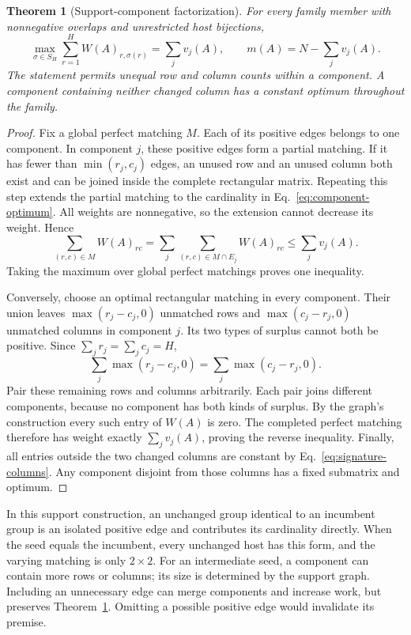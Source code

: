 \documentclass[11pt]{article}
\newtheorem{theorem}{Theorem}
\begin{document}
\begin{theorem}[Support-component factorization]\label{thm:component}
For every family member with nonnegative overlaps and unrestricted host bijections,
\begin{equation}
\max_{\sigma\in S_H}\sum_{r=1}^H W(A)_{r,\sigma(r)}=\sum_jv_j(A),\qquad
m(A)=N-\sum_jv_j(A).
\label{eq:component-factorization}
\end{equation}
The statement permits unequal row and column counts within a component. A component containing neither changed column has a constant optimum throughout the family.
\end{theorem}
\begin{proof}
Fix a global perfect matching $M$. Each of its positive edges belongs to one component. In component $j$, these positive edges form a partial matching. If it has fewer than $\min(r_j,c_j)$ edges, an unused row and an unused column both exist and can be joined inside the complete rectangular matrix. Repeating this step extends the partial matching to the cardinality in Eq.~\eqref{eq:component-optimum}. All weights are nonnegative, so the extension cannot decrease its weight. Hence
\begin{equation}
\sum_{(r,c)\in M}W(A)_{rc}
=\sum_j\sum_{(r,c)\in M\cap E_j}W(A)_{rc}
\le\sum_jv_j(A).
\end{equation}
Taking the maximum over global perfect matchings proves one inequality.

Conversely, choose an optimal rectangular matching in every component. Their union leaves $\max(r_j-c_j,0)$ unmatched rows and $\max(c_j-r_j,0)$ unmatched columns in component $j$. Its two types of surplus cannot both be positive. Since $\sum_jr_j=\sum_jc_j=H$,
\begin{equation}
\sum_j\max(r_j-c_j,0)=\sum_j\max(c_j-r_j,0).
\end{equation}
Pair these remaining rows and columns arbitrarily. Each pair joins different components, because no component has both kinds of surplus. By the graph's construction every such entry of $W(A)$ is zero. The completed perfect matching therefore has weight exactly $\sum_jv_j(A)$, proving the reverse inequality. Finally, all entries outside the two changed columns are constant by Eq.~\eqref{eq:signature-columns}. Any component disjoint from those columns has a fixed submatrix and optimum.
\end{proof}

In this support construction, an unchanged group identical to an incumbent group is an isolated positive edge and contributes its cardinality directly. When the seed equals the incumbent, every unchanged host has this form, and the varying matching is only $2\times2$. For an intermediate seed, a component can contain more rows or columns; its size is determined by the support graph. Including an unnecessary edge can merge components and increase work, but preserves Theorem~\ref{thm:component}. Omitting a possible positive edge would invalidate its premise.
\end{document}
